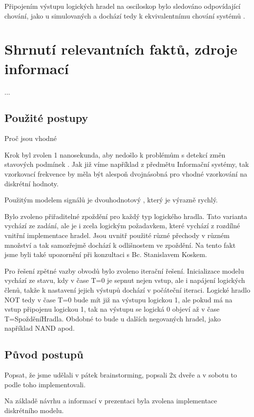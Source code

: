 \documentclass[11pt,a4paper]{article}
\begin{document}
			Připojením výstupu logických hradel na osciloskop bylo sledováno odpovídající chování, jako u simulovaných a dochází tedy k ekvivalentnímu chování systémů .
		
		

	\section{Shrnutí relevantních faktů, zdroje informací}
		...	
		
		\subsection{Použité postupy}
			Proč jsou vhodné
			
			Krok byl zvolen 1 nanosekunda, aby nedošlo k problémům s detekcí změn stavových podmínek . Jak již víme například z předmětu Informační systémy, tak vzorkovací frekvence by měla být alespoň dvojnásobná pro vhodné vzorkování na diskrétní hodnoty.
			
			Použitým modelem signálů je dvouhodnotový , který je výrazně rychlý. 
			
			Bylo zvoleno přiřaditelné zpoždění  pro každý typ logického hradla. Tato varianta vychází ze zadání, ale je i zcela logickým požadavkem, které vychází z rozdílné vnitřní implementace hradel. Jsou uvnitř použité různé přechody v různém množství a tak samozřejmě dochází k odlišnostem ve zpoždění. Na tento fakt jsme byli také upozornění při konzultaci s Bc. Stanislavem Koskem.
			
			Pro řešení zpětné vazby obvodů bylo zvoleno iterační řešení. Inicializace modelu  vychází ze stavu, kdy v čase T=0 je sepnut nejen vstup, ale i napájení logických členů, takže k nastavení jejich výstupů dochází v počáteční iteraci. Logické hradlo NOT tedy v čase T=0 bude mít již na výstupu logickou 1, ale pokud má na vstup připojenu logickou 1, tak na výstupu se logická 0 objeví až v čase T=SpožděníHradla. Obdobné to bude u dalších negovaných hradel, jako například NAND apod.
		

			
		\subsection{Původ postupů}
			Popsat, že jsme udělali v pátek brainstorming, popsali 2x dveře a v sobotu to podle toho implementovali.
			
			Na základě návrhu a informací v prezentaci  byla zvolena implementace diskrétního modelu.
	
\end{document}
